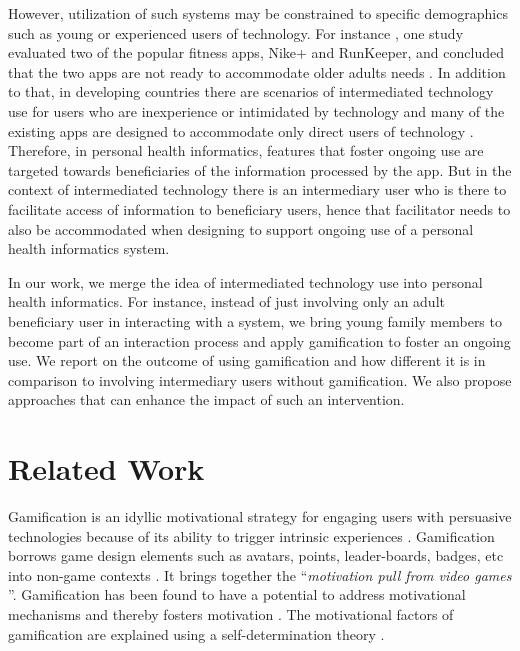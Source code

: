 \documentclass{sig-alternate}
\begin{document}
However, utilization of such systems may be constrained to specific demographics such as young or experienced users of technology. For instance , one study evaluated two of the popular fitness apps, Nike+ and RunKeeper, and concluded that the two apps are not ready to accommodate older adults needs \cite{silva2014:smartphones}. In addition to that, in developing countries there are scenarios of intermediated technology use for users who are inexperience or intimidated by technology and many of the existing apps are designed to accommodate only direct users of technology \cite{sambasivan2010}. Therefore, in personal health informatics, features that foster ongoing use are targeted towards beneficiaries of the information processed by the app. But in the context of intermediated technology there is an intermediary user who is there to facilitate access of information to beneficiary users, hence that facilitator needs to also be accommodated when designing to support ongoing use of a personal health informatics system.

In our work, we merge the idea of intermediated technology use into personal health informatics. For instance, instead of just involving only an adult beneficiary user in interacting with a system, we bring young family members to become part of an interaction process and apply gamification to foster an ongoing use. We report on the outcome of using gamification and how different it is in comparison to involving intermediary users without gamification. We also propose approaches that can enhance the impact of such an intervention.
\section{Related Work} 
Gamification is an idyllic motivational strategy for engaging users with persuasive technologies because of its ability to trigger intrinsic experiences \cite{hamari2014persuasive}. Gamification borrows game design elements such as avatars, points, leader-boards, badges, etc into non-game contexts \cite{deterding2011game}. It brings together the ``\emph{motivation pull from video games} \cite{ryan2006:motivationalpull}''. Gamification has been found to have a potential to address motivational mechanisms and thereby fosters motivation \cite{sailer2013:psychological}. The motivational  factors of gamification are explained using a self-determination theory \cite{deci1985:intrinsic}.    
\end{document}
